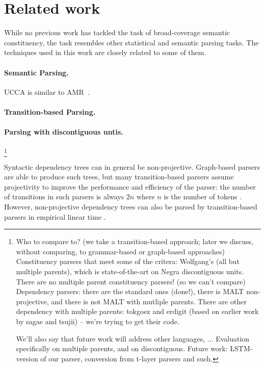 \documentclass[11pt]{article}
\newcommand{\oa}[1]{\footnote{\color{red} #1}}
\begin{document}
\section{Related work}

While no previous work has tackled the task of broad-coverage semantic constituency, 
the task resembles other statistical and semantic parsing tasks. The techniques used
in this work are closely related to some of them.

\paragraph{Semantic Parsing.}

UCCA is similar to AMR~\cite{flanigan2014discriminative,artzi2015broad}.

\paragraph{Transition-based Parsing.}

\paragraph{Parsing with discontiguous untis.}
\oa{Who to compare to? (we take a transition-based approach; later we discuss,
  without comparing, to grammar-based
  or graph-based approaches)
  Constituency parsers that meet some of the critera: Wolfgang's (all but multiple parents),
        which is state-of-the-art on Negra discontiguous units.
        There are no multiple parent constituency parsers! (so we can't compare)
  Dependency parsers: there are the standard ones (done!), there is MALT non-projective, and there is not MALT with mutliple parents. There are other dependency with multiple parents: tokgoez and erdigit (based on earlier work by sagae and tsujii) -- we're trying to get their code.
  
  We'll also say that future work will address other languages, ...
  Evaluation specifically on multiple parents, and on discontiguous.
  Future work: LSTM-version of our parser, conversion from t-layer parsers and such.
}

Syntactic dependency trees can in general be non-projective. Graph-based parsers are able to produce such trees, but many transition-based parsers assume projectivity to improve the performance and efficiency of the parser: the number of transitions in such parsers is always $2n$ where $n$ is the number of tokens \cite{nivre2004incrementality}. However, non-projective dependency trees can also be parsed by transition-based parsers in empirical linear time \cite{nivre2009non}.
\end{document}
